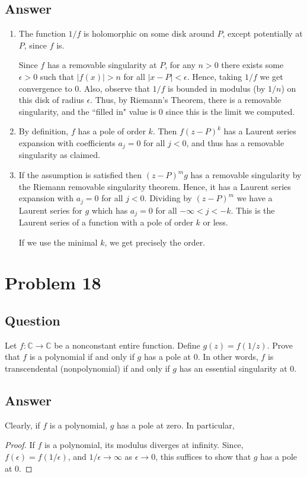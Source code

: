 \documentclass[11pt]{article}
\begin{document}
\subsection{Answer}
\begin{enumerate}
\item 
The function $1/f$ is holomorphic on some disk around $P$, except potentially at $P$, since $f$ is.

Since $f$ has a removable singularity at $P$, for any $n > 0$ there exists some $\epsilon >0$ such that $|f(x)| > n$ for all $|x-P| < \epsilon$. Hence, taking $1/f$ we get convergence to 0. Also, observe that $1/f$ is bounded in modulus (by $1/n$) on this disk of radius $\epsilon$. Thus, by Riemann's Theorem, there is a removable singularity, and the ``filled in" value is 0 since this is the limit we computed.
\item By definition, $f$ has a pole of order $k$. Then $f (z-P)^k$ has a Laurent series expansion with coefficients $a_j = 0$ for all $j <0$, and thus has a removable singularity as claimed.
\item If the assumption is satisfied then $(z-P)^m g$ has a removable singularity by the Riemann removable singularity theorem. Hence, it has a Laurent series expansion with $a_j = 0$ for all $j<0$. Dividing by $(z-P)^m$ we have a Laurent series for $g$ which has $a_j= 0$ for all $-\infty < j < -k$. This is the Laurent series of a function with a pole of order $k$ or less.

 If we use the minimal $k$, we get precisely the order.
\end{enumerate}

\section{Problem 18}
\subsection{Question}
Let $f: \mathbb{C} \to \mathbb{C}$ be a nonconstant entire function. Define $g(z) =f(1/z)$. Prove that $f$ is a polynomial if and only if $g$ has a pole at 0. In other words, $f$ is transcendental (nonpolynomial) if and only if $g$ has an essential singularity at 0.
\subsection{Answer}
Clearly, if $f$ is a polynomial, $g$ has a pole at zero. In particular,
\begin{proof}
If $f$ is a polynomial, its modulus diverges at infinity. Since, $f(\epsilon) = f(1/\epsilon)$, and $1/\epsilon \to \infty$ as $\epsilon \to 0$, this suffices to show that $g$ has a pole at 0.
\end{proof}
\end{document}
